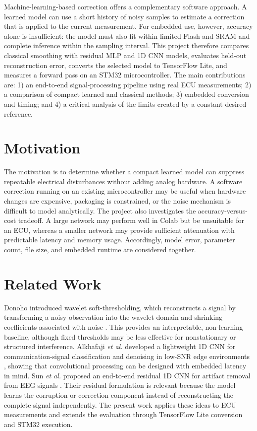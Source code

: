 \documentclass[conference]{IEEEtran}
\begin{document}
Machine-learning-based correction offers a complementary software approach. A learned model can use a short history of noisy samples to estimate a correction that is applied to the current measurement. For embedded use, however, accuracy alone is insufficient: the model must also fit within limited Flash and SRAM and complete inference within the sampling interval. This project therefore compares classical smoothing with residual MLP and 1D CNN models, evaluates held-out reconstruction error, converts the selected model to TensorFlow Lite, and measures a forward pass on an STM32 microcontroller. The main contributions are: 1) an end-to-end signal-processing pipeline using real ECU measurements; 2) a comparison of compact learned and classical methods; 3) embedded conversion and timing; and 4) a critical analysis of the limits created by a constant desired reference.

\section{Motivation}
The motivation is to determine whether a compact learned model can suppress repeatable electrical disturbances without adding analog hardware. A software correction running on an existing microcontroller may be useful when hardware changes are expensive, packaging is constrained, or the noise mechanism is difficult to model analytically. The project also investigates the accuracy-versus-cost tradeoff. A large network may perform well in Colab but be unsuitable for an ECU, whereas a smaller network may provide sufficient attenuation with predictable latency and memory usage. Accordingly, model error, parameter count, file size, and embedded runtime are considered together.

\section{Related Work}
Donoho introduced wavelet soft-thresholding, which reconstructs a signal by transforming a noisy observation into the wavelet domain and shrinking coefficients associated with noise \cite{b1}. This provides an interpretable, non-learning baseline, although fixed thresholds may be less effective for nonstationary or structured interference. Alkhafaji \textit{et al.} developed a lightweight 1D CNN for communication-signal classification and denoising in low-SNR edge environments \cite{b2}, showing that convolutional processing can be designed with embedded latency in mind. Sun \textit{et al.} proposed an end-to-end residual 1D CNN for artifact removal from EEG signals \cite{b3}. Their residual formulation is relevant because the model learns the corruption or correction component instead of reconstructing the complete signal independently. The present work applies these ideas to ECU measurements and extends the evaluation through TensorFlow Lite conversion and STM32 execution.
\end{document}

